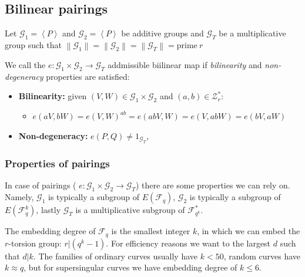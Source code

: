 
\subsection{Bilinear pairings}
\label{ssec:apx.ecc.curves.pairings}

Let $\mathcal{G}_1 = \left< P \right>$ and $\mathcal{G}_2 = \left< P \right>$
be additive groups and $\mathcal{G}_T$ be a
multiplicative group such that $\left\| \mathcal{G}_1 \right\| = \left\| \mathcal{G}_2 \right\| = \left\| \mathcal{G}_T \right\|= \mathrm{prime}~ r$

We call the $e: \mathcal{G}_1 \times \mathcal{G}_2 \rightarrow \mathcal{G}_T $
addmissible biilinear map if \textit{bilinearity} and
\textit{non-degeneracy} properties are satisfied:

\begin{itemize}
    \item[] \textbf{Bilinearity: } given $(V, W) \in \mathcal{G}_1 \times \mathcal{G}_2$ and
    $(a,b) \in \mathcal{Z}^{*}_{r}$:
    \begin{itemize}
        \item[] $e(aV, bW) = e(V, W)^{ab} = e(abV, W) = e(V, abW) = e(bV, aW)$
        \end{itemize}
    \item[] \textbf{Non-degeneracy:} $e(P,Q) \neq 1_{\mathcal{G}_T}$,
    \end{itemize}

\subsubsection{Properties of pairings}

In case of pairings ( $e: \mathcal{G}_1 \times \mathcal{G}_2 \rightarrow \mathcal{G}_T $) there are some properties we can rely on.
Namely, $\mathcal{G}_1$ is typically a subgroup of $E(\mathcal{F}_q)$,
$\mathcal{G}_2$ is typically a subgroup of $E(\mathcal{F}_q^k)$,
lastly $\mathcal{G}_T$ is a multiplicative subgroup of $\mathcal{F}^*_{q^k}$.\cite{ecc.fam.param}

The embedding degree of $\mathcal{F}_q$ is the smallest integer $k$,
in which we can embed the $r$-torsion group: $r|(q^k-1)$. For efficiency reasons
we want to the largest $d$ such that $d|k$.\cite{ecc.fam.param}
The families of ordinary curves usually have $k < 50$, random curves have
$k \approx q$, but for supersingular curves we have embedding degree of
$k \leq 6$.\cite{ecc.fam.param}

